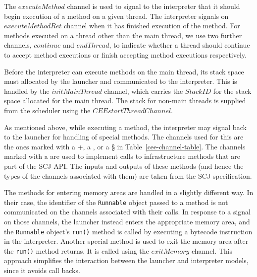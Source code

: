 The $executeMethod$ channel is used to signal to the interpreter that
it should begin execution of a method on a given thread.
The interpreter signals on $executeMethodRet$ channel when it has
finished execution of the method.
For methods executed on a thread other than the main thread, we use
two further channels, $continue$ and $endThread$, to indicate whether
a thread should continue to accept method executions or finish
accepting method executions respectively.

Before the interpreter can execute methods on the main thread, its
stack space must allocated by the launcher and
communicated to the interpreter.
This is handled by the $initMainThread$ channel, which carries the
$StackID$ for the stack space allocated for the main thread.
The stack for non-main threads is supplied from the scheduler using
the $CEEstartThreadChannel$.

As mentioned above, while executing a method, the interpreter may
signal back to the launcher for handling of special methods.
The channels used for this are the ones marked with a {}+{}, a \dag{},
or a \S{} in Table~\ref{cee-channel-table}.
The channels marked with a \dag{} are used to implement calls to
infrastructure methods that are part of the SCJ API.
The inputs and outputs of these methods (and hence the types of the
channels associated with them) are taken from the SCJ specification.

The methods for entering memory areas are handled in a slightly
different way. 
In their case, the identifier of the \texttt{Runnable} object passed
to a method is not communicated on the channels associated with their
calls.
In response to a signal on those channels, the launcher instead enters
the appropriate memory area, and the \texttt{Runnable} object's
\texttt{run()} method is called by executing a bytecode instruction in
the interpreter.
Another special method is used to exit the memory area after the
\texttt{run()} method returns.
It is called using the $exitMemory$ channel.
This approach simplifies the interaction between the launcher and
interpreter models, since it avoids call backs.

